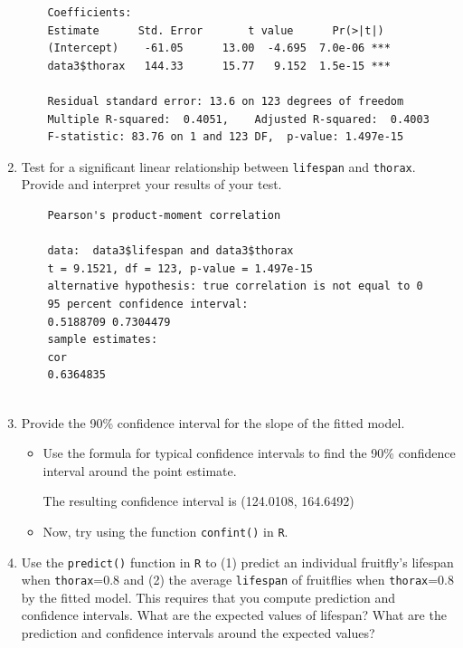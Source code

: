 \documentclass[12pt,letterpaper]{article}
\begin{document}
\begin{enumerate}
	
	\begin{Verbatim}
	Coefficients:
	Estimate      Std. Error       t value      Pr(>|t|)    
	(Intercept)    -61.05      13.00  -4.695  7.0e-06 ***
	data3$thorax   144.33      15.77   9.152  1.5e-15 ***
	
	Residual standard error: 13.6 on 123 degrees of freedom
	Multiple R-squared:  0.4051,	Adjusted R-squared:  0.4003 
	F-statistic: 83.76 on 1 and 123 DF,  p-value: 1.497e-15	
	\end{Verbatim}
			\vspace{.5cm}
	\item
	Test for a significant linear relationship between  \texttt{lifespan} and \texttt{thorax}. Provide and interpret your results of your test.
	\begin{Verbatim}
	Pearson's product-moment correlation
	
	data:  data3$lifespan and data3$thorax
	t = 9.1521, df = 123, p-value = 1.497e-15
	alternative hypothesis: true correlation is not equal to 0
	95 percent confidence interval:
	0.5188709 0.7304479
	sample estimates:
	cor 
	0.6364835 
	
	\end{Verbatim}
	
\newpage
	\item
	
	Provide the 90\% confidence interval for the slope of the fitted model.
	
			\vspace{.5cm}
	\begin{itemize}
		\item
		Use the formula for typical confidence intervals to find the 90\% confidence interval around the point estimate.		
		
		The resulting confidence interval is (124.0108, 164.6492)
		\vspace{.5cm}
		\item
		Now, try using the function  \texttt{confint()}  in \texttt{R}.
				
	\end{itemize}
			\vspace{1cm}
	\item Use the \texttt{predict()} function in \texttt{R} to (1) predict an individual fruitfly's lifespan when \texttt{thorax}=0.8 and (2) the average \texttt{lifespan} of fruitflies when \texttt{thorax}=0.8 by the fitted model. This requires that you compute prediction and confidence intervals. What are the expected values of lifespan? What are the prediction and confidence intervals around the expected values? 
	

\end{enumerate}
\end{document}
